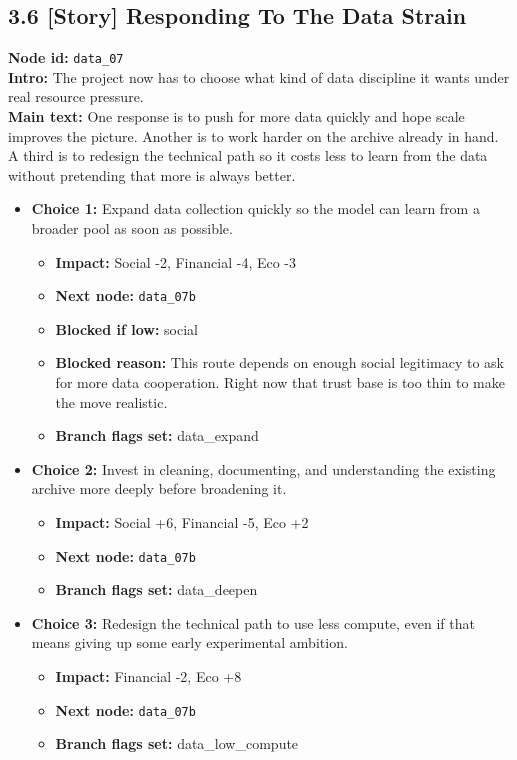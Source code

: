\documentclass[11pt]{article}
\begin{document}
\subsection*{3.6 [Story] Responding To The Data Strain}
\textbf{Node id:} \texttt{data\_07}\\
\textbf{Intro:} The project now has to choose what kind of data discipline it wants under real resource pressure.\\
\textbf{Main text:} One response is to push for more data quickly and hope scale improves the picture. Another is to work harder on the archive already in hand. A third is to redesign the technical path so it costs less to learn from the data without pretending that more is always better.\\
\begin{itemize}
\item \textbf{Choice 1:} Expand data collection quickly so the model can learn from a broader pool as soon as possible.
\begin{itemize}
\item \textbf{Impact:} Social -2, Financial -4, Eco -3
\item \textbf{Next node:} \texttt{data\_07b}
\item \textbf{Blocked if low:} social
\item \textbf{Blocked reason:} This route depends on enough social legitimacy to ask for more data cooperation. Right now that trust base is too thin to make the move realistic.
\item \textbf{Branch flags set:} data\_expand
\end{itemize}
\item \textbf{Choice 2:} Invest in cleaning, documenting, and understanding the existing archive more deeply before broadening it.
\begin{itemize}
\item \textbf{Impact:} Social +6, Financial -5, Eco +2
\item \textbf{Next node:} \texttt{data\_07b}
\item \textbf{Branch flags set:} data\_deepen
\end{itemize}
\item \textbf{Choice 3:} Redesign the technical path to use less compute, even if that means giving up some early experimental ambition.
\begin{itemize}
\item \textbf{Impact:} Financial -2, Eco +8
\item \textbf{Next node:} \texttt{data\_07b}
\item \textbf{Branch flags set:} data\_low\_compute
\end{itemize}
\end{itemize}
\end{document}
